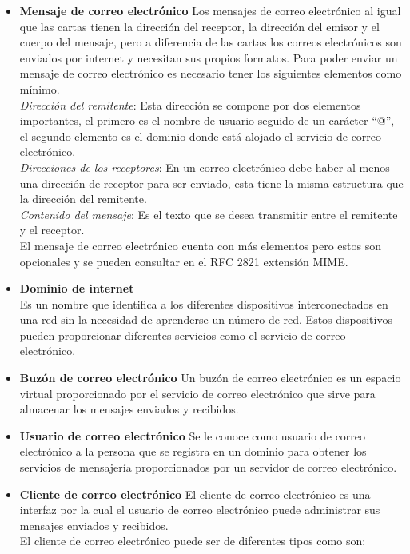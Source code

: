 \documentclass[12pt,oneside,onecolumn,openany]{report}
\begin{document}
\begin{itemize}
\item \textbf{Mensaje de correo electrónico}
Los  mensajes  de  correo  electrónico  al  igual  que  las  cartas  tienen  la  dirección  del receptor, la dirección del emisor y el cuerpo del mensaje, pero a diferencia de las cartas 
los correos electrónicos son enviados por internet y necesitan sus propios formatos. Para  poder  enviar  un  mensaje  de  correo  electrónico  es  necesario  tener  los siguientes  elementos 
como mínimo.\\ 
\textit{Dirección  del  remitente}:  Esta  dirección  se  compone  por  dos  elementos  importantes,  el primero es el nombre de usuario seguido de un carácter “@”, el segundo elemento es 
el dominio donde está alojado el servicio de correo electrónico.\\ 
\textit{Direcciones  de  los  receptores}:  En  un  correo  electrónico  debe  haber  al  menos  una dirección  de  receptor  para  ser  enviado,  esta    tiene  la  misma estructura que la dirección del remitente.     \\  
\textit{Contenido  del  mensaje}:  Es  el  texto  que  se  desea  transmitir entre  el  remitente  y  el receptor. \\ 
El mensaje de correo electrónico cuenta con más elementos pero estos son opcionales y se pueden consultar en el RFC 2821 extensión MIME. 
\item \textbf{Dominio de internet}\\
Es un nombre que identifica a los diferentes dispositivos interconectados en una red sin la  necesidad  de  aprenderse  un  número  de  red.  Estos  dispositivos  pueden  proporcionar 
diferentes servicios como el servicio de correo electrónico. 
\item \textbf{Buzón de correo electrónico}
Un  buzón  de  correo  electrónico  es  un  espacio  virtual  proporcionado  por  el  servicio  de correo electrónico que sirve para almacenar los mensajes enviados y recibidos. 
\item \textbf{Usuario de correo electrónico}
Se  le  conoce  como  usuario  de  correo  electrónico  a  la  persona  que  se  registra  en  un dominio  para  obtener  los  servicios  de  mensajería  proporcionados  por  un  servidor  de correo electrónico. 
\item \textbf{Cliente de correo electrónico}
El  cliente  de  correo  electrónico  es  una  interfaz  por  la  cual  el  usuario  de  correo  electrónico puede administrar sus mensajes enviados y recibidos. \\
El cliente de correo electrónico puede ser de diferentes tipos como son: 


\end{itemize}
\end{document}
